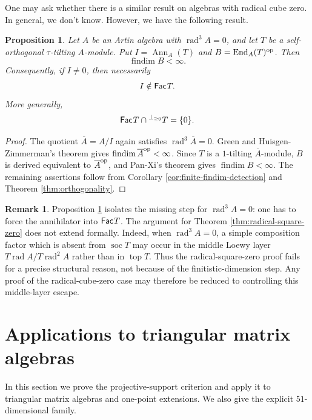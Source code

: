 \documentclass[a4paper,reqno]{amsart}
\newtheorem{proposition}[theorem]{Proposition}
\theoremstyle{definition}
\newtheorem{remark}[theorem]{Remark}
\newcommand{\End}{\operatorname{End}\nolimits}
\newcommand{\Ann}{\operatorname{Ann}\nolimits}
\newcommand{\rad}{\operatorname{rad}\nolimits}
\newcommand{\soc}{\operatorname{soc}\nolimits}
\newcommand{\topm}{\operatorname{top}\nolimits}
\newcommand{\Fac}{\mathsf{Fac}\hspace{.01in}}
\newcommand{\findim}{\operatorname{findim}\nolimits}
\numberwithin{equation}{section}
\begin{document}
One may ask whether there is a similar result on algebras with radical cube zero. In general, we don't know. However, we have the following result.

\begin{proposition}
\label{prop:radical-cube-zero-reduction}
Let $A$ be an Artin algebra with $\rad^3 A=0$, and let
$T$ be a self-orthogonal $\tau$-tilting $A$-module. Put
$I=\Ann_A(T)$ and $B=\End_A(T)^{\rm op}$. Then
\[
                    \findim B<\infty.
\]
Consequently, if $I\neq0$, then necessarily
\[
                              I\notin\Fac T.
\]
More generally,
\[
                  \Fac T\cap{}^{\perp_{\geq0}}T=\{0\}.
\]
\end{proposition}

\begin{proof}
The quotient $\overline A=A/I$ again satisfies
$\rad^3\overline A=0$. Green and Huisgen-Zimmerman's theorem \cite[Theorem 16]{GreenHuisgen} gives
$\findim\overline A^{\rm op}<\infty$. Since $T$ is a
$1$-tilting $\overline A$-module, $B$ is derived equivalent to
$\overline A^{\rm op}$, and Pan-Xi's theorem \cite[Theorem 1.1]{PanXi} gives
$\findim B<\infty$. The remaining assertions
follow from Corollary \ref{cor:finite-findim-detection} and Theorem
\ref{thm:orthogonality}.
\end{proof}

\begin{remark}
\label{rem:radical-cube-zero-bottleneck}
Proposition \ref{prop:radical-cube-zero-reduction} isolates the missing
step for $\rad^3 A=0$: one has to force the annihilator into
$\Fac T$. The argument for Theorem \ref{thm:radical-square-zero}
does not extend formally. Indeed, when $\rad^3 A=0$, a simple
composition factor which is absent from $\soc T$ may occur in the
middle Loewy layer $T\rad A/T\rad^2 A$ rather than in $\topm T$.
Thus the radical-square-zero proof fails for a precise structural
reason, not because of the finitistic-dimension step. Any proof of the
radical-cube-zero case may therefore be reduced to controlling this
middle-layer escape.
\end{remark}

\section{Applications to triangular matrix algebras}

In this section we prove the projective-support criterion and apply it to triangular
matrix algebras and one-point extensions. We also give the explicit
$51$-dimensional family.
\end{document}
